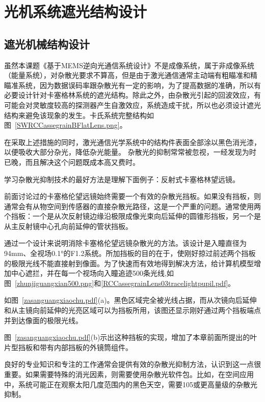 \section{光机系统遮光结构设计}
 
\subsection{遮光机械结构设计}
虽然本课题《基于MEMS逆向光通信系统设计》不是成像系统，属于非成像系统（能量系统），对杂散光要求不算高，但是由于激光通信通常主动端有粗瞄准和精瞄准系统，因为数据误码率跟杂散光有一定的影响，为了提高数据的准确，所以有必要设计针对卡塞格林系统的遮光结构。除此之外，由杂散光引起的回波效应，有可能会对灵敏度较高的探测器产生自激效应，系统造成干扰，所以也必须设计遮光结构来避免该现象的发生。卡氏系统完整结构如图~\ref{SWRCCassegrainBFlatLens.png}。

在采取上述措施的同时，激光通信光学系统中的结构件表面全部涂以黑色消光漆，以便吸收大部分杂光，降低杂光能量。
杂散光的抑制常常被忽视，一经发现为时已晚，而且解决这个问题既成本高又费时。

学习杂散光抑制技术的最好方法是理解下面例子：反射式卡塞格林望远镜。

前面讨论过的卡塞格伦望远镜始终需要一个有效的杂散光挡板。如果没有挡板，则通常会有从物空间到传感器的直接杂散光路径，这是一个严重的问题。通常使用两个挡板：一个是从次反射镜边缘沿极限成像光束向后延伸的圆锥形挡板，另一个是从主反射镜中心孔向前延伸的管状挡板。

通过一个设计来说明消除卡塞格伦望远镜杂散光的方法。该设计是入瞳直径为94mm、全视场0.1°的F1.2系统。所加挡板的目的在于，使刚好掠过前述两个挡板的极限光线不能直接射到像面。为了快速而有效地得到解决方法，给计算机模型增加中心遮拦，并在每一个视场向入瞳追迹500条光线,如图~\ref{zhunjiguangxian500.png}和\ref{RCCassegrainLens03tracelightpupil.pdf}。


如图~\ref{zasanguangxiaochu.pdf}(a)。黑色区域完全被光线占据，而从次镜向后延伸和从主镜向前延伸的光亮区域可以为挡板所用，该图还显示刚好通过两个挡板端点并到达像面的极限光线。

图~\ref{zasanguangxiaochu.pdf}(b)示出这种挡板的实现，增加了本章前面所提出的叶片型挡板和带有内部挡板的外镜筒组件。

良好的专业知识和专注的工作通常会提供有效的杂散光抑制方法，认识到这一点很重要。如果需要特殊的消光因素，则需要使用杂散光软件包。比如，在空间应用中，系统可能正在观察太阳几度范围内的黑色天空，需要105或更高量级的杂散光抑制。

